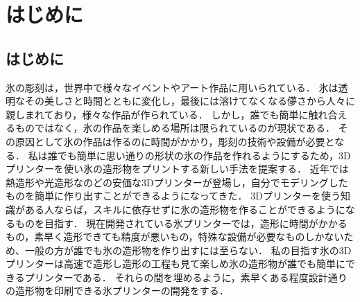\chapter{はじめに}
\label{chp:first}

\section{はじめに}
\label{sec:paragraph}

氷の彫刻は，世界中で様々なイベントやアート作品に用いられている．
氷は透明なその美しさと時間とともに変化し，最後には溶けてなくなる儚さから人々に親しまれており，様々な作品が作られている．
しかし，誰でも簡単に触れ合えるものではなく，氷の作品を楽しめる場所は限られているのが現状である．
その原因として氷の作品は作るのに時間がかかり，彫刻の技術や設備が必要となる．
私は誰でも簡単に思い通りの形状の氷の作品を作れるようにするため，3Dプリンターを使い氷の造形物をプリントする新しい手法を提案する．
近年では熱造形や光造形なのどの安価な3Dプリンターが登場し，自分でモデリングしたものを簡単に作り出すことができるようになってきた．
3Dプリンターを使う知識がある人ならば，スキルに依存せずに氷の造形物を作ることができるようになるものを目指す．
現在開発されている氷プリンターでは，造形に時間がかかるもの，素早く造形できても精度が悪いもの，特殊な設備が必要なものしかないため、一般の方が誰でも氷の造形物を作り出すには至らない．
私の目指す氷の3Dプリンターは高速で造形し造形の工程も見て楽しめ氷の造形物が誰でも簡単にできるプリンターである．
それらの間を埋めるように，素早くある程度設計通りの造形物を印刷できる氷プリンターの開発をする．

